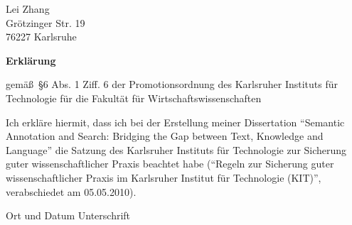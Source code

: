 \cleardoublepage
{}
\thispagestyle{plain}
\vspace{-3cm}
\begin{flushright}
  \noindent
  Lei Zhang\\
  Gr\"otzinger Str. 19\\
  76227 Karlsruhe\\
\end{flushright}

\vspace{0.5cm}

\begin{center}
\textbf{\Large{Erkl\"arung}}\\
\vspace{0.5cm}

\noindent
gem\"a\ss~\S 6 Abs. 1 Ziff. 6 der Promotionsordnung des Karlsruher
Instituts f\"ur Technologie f\"ur die Fakult\"at f\"ur
Wirtschaftswissenschaften
\end{center}


\noindent
Ich erkl\"are hiermit, dass ich bei der Erstellung meiner Dissertation
``Semantic Annotation and Search: Bridging the Gap between Text, Knowledge and Language'' die Satzung des Karlsruher Instituts f\"ur Technologie
zur Sicherung guter wissenschaftlicher Praxis beachtet habe (``Regeln
zur Sicherung guter wissenschaftlicher Praxis im Karlsruher Institut
f\"ur Technologie (KIT)'', verabschiedet am 05.05.2010).  

\vspace{1cm}

\noindent Ort und Datum \hspace{5cm} Unterschrift

